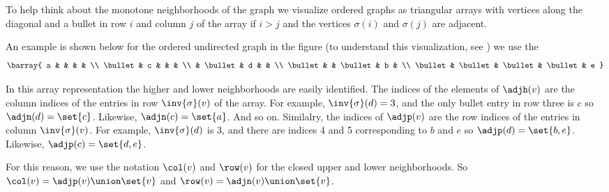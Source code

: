To help think about the monotone neighborhoods of the graph we visualize ordered graphs as triangular arrays with vertices along the diagonal and a bullet in row $i$ and column $j$ of the array if $i > j$ and the  vertices $\sigma(i)$ and $\sigma(j)$ are adjacent.

An example is shown below for the ordered undirected graph in the figure (to understand this visualization, see ) we use the
\[
\barray{
  a     &   & & & \\
  \bullet & c & & & \\
   & \bullet & d & & \\
   \bullet & & \bullet & b & \\
   \bullet & \bullet & \bullet & \bullet & e
}
\]

In this array representation the higher and lower neighborhoods are easily identified.
The indices of the elements of $\adjh(v)$ are the column indices of the entries in row $\inv{\sigma}(v)$ of the array.
For example, $\inv{\sigma}(d) = 3$, and the only bullet entry in row three is $c$ so $\adjn(d) = \set{c}$.
Likewise, $\adjn(c) = \set{a}$.
And so on.
Similalry, the indices of $\adjp(v)$ are the row indices of the entries in column $\inv{\sigma}(v)$.
For example, $\inv{\sigma}(d)$ is $3$, and there are indices 4 and 5 corresponding to $b$ and $e$ so $\adjp(d) = \set{b, e}$.
Likewise, $\adjp(c) = \set{d, e}$.

For this reason, we use the notation $\col(v)$ and $\row(v)$ for the closed upper and lower neighborhoods.
  So $\col(v) = \adjp(v) \union \set{v}$ and $\row(v) = \adjn(v) \union \set{v}$.

\blankpage
